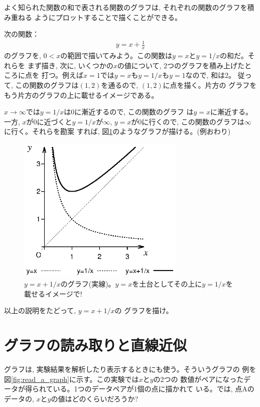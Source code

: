 よく知られた関数の和で表される関数のグラフは, それぞれの関数のグラフを積み重ねる
ようにプロットすることで描くことができる。
\begin{exmpl}
次の関数：
\begin{eqnarray}y=x+\frac{1}{x}\end{eqnarray}
のグラフを, $0<x$の範囲で描いてみよう。この関数は$y=x$と$y=1/x$の和だ。それらを
まず描き, 次に, いくつかの$x$の値について, 2つのグラフを積み上げたところに点を
打つ。例えば$x=1$では$y=x$も$y=1/x$も$y=1$なので, 和は2。
従って, この関数のグラフは$(1, 2)$を通るので, $(1, 2)$に点を描く。片方の
グラフをもう片方のグラフの上に載せるイメージである。

$x\rightarrow \infty$では$y=1/x$は0に漸近するので, この関数のグラフ
は$y=x$に漸近する。一方, $x$が$0$に近づくと$y=1/x$が$\infty$, $y=x$が0に行くので, 
この関数のグラフは$\infty$に行く。それらを勘案
すれば, 図\ref{fig:x_plus_1_over_x}のようなグラフが描ける。(例おわり)\end{exmpl}
\begin{figure}[h]
    \centering
    \includegraphics[width=8cm]{x_plus_1_over_x.eps}
    \caption{$y=x+1/x$のグラフ(実線)。$y=x$を土台としてその上に$y=1/x$を
載せるイメージで!}\label{fig:x_plus_1_over_x}
\end{figure}

\begin{q}\label{q:x_plus_1_over_x} 以上の説明をたどって, $y=x+1/x$の
グラフを描け。\end{q}\hv



\section{グラフの読み取りと直線近似}

グラフは, 実験結果を解析したり表示するときにも使う。そういうグラフの
例を図\ref{fig:read_a_graph}に示す。この実験では$x$と$y$の2つの
数値がペアになったデータが得られている。1つのデータペアが1個の点に描かれて
いる。では, 点Aのデータの, $x$と$y$の値はどのくらいだろうか?

